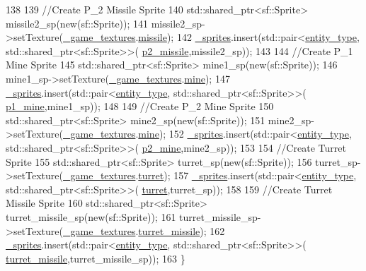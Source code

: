 \begin{DoxyCode}
138 
139     \textcolor{comment}{//Create P\_2 Missile Sprite}
140     std::shared\_ptr<sf::Sprite> missile2\_sp(\textcolor{keyword}{new}(sf::Sprite));
141     missile2\_sp->setTexture(\hyperlink{classDisplay_a64ae525710346f1a982efa05b8c53a88}{\_game\_textures}.\hyperlink{structtextures_a1d12557e92da80a9809f037edfe72f2f}{missile});
142     \hyperlink{classDisplay_a975326ca007706c154317ddef67000f4}{\_sprites}.insert(std::pair<\hyperlink{Structures_8h_a6d8f83e710b27d4f86c45f0bb77066e3}{entity\_type}, std::shared\_ptr<sf::Sprite>>(
      \hyperlink{Structures_8h_a6d8f83e710b27d4f86c45f0bb77066e3a47100170e5852d632dfe65582a18256d}{p2\_missile},missile2\_sp));
143 
144     \textcolor{comment}{//Create P\_1 Mine Sprite}
145     std::shared\_ptr<sf::Sprite> mine1\_sp(\textcolor{keyword}{new}(sf::Sprite));
146     mine1\_sp->setTexture(\hyperlink{classDisplay_a64ae525710346f1a982efa05b8c53a88}{\_game\_textures}.\hyperlink{structtextures_a7f5b6643fd47d1bd8d5758c24c32dc9e}{mine});
147     \hyperlink{classDisplay_a975326ca007706c154317ddef67000f4}{\_sprites}.insert(std::pair<\hyperlink{Structures_8h_a6d8f83e710b27d4f86c45f0bb77066e3}{entity\_type}, std::shared\_ptr<sf::Sprite>>(
      \hyperlink{Structures_8h_a6d8f83e710b27d4f86c45f0bb77066e3afc52e626787e982ae5d0a747bed6666d}{p1\_mine},mine1\_sp));
148 
149     \textcolor{comment}{//Create P\_2 Mine Sprite}
150     std::shared\_ptr<sf::Sprite> mine2\_sp(\textcolor{keyword}{new}(sf::Sprite));
151     mine2\_sp->setTexture(\hyperlink{classDisplay_a64ae525710346f1a982efa05b8c53a88}{\_game\_textures}.\hyperlink{structtextures_a7f5b6643fd47d1bd8d5758c24c32dc9e}{mine});
152     \hyperlink{classDisplay_a975326ca007706c154317ddef67000f4}{\_sprites}.insert(std::pair<\hyperlink{Structures_8h_a6d8f83e710b27d4f86c45f0bb77066e3}{entity\_type}, std::shared\_ptr<sf::Sprite>>(
      \hyperlink{Structures_8h_a6d8f83e710b27d4f86c45f0bb77066e3ada293b37940e64ec2cf6dbd2ae493d2b}{p2\_mine},mine2\_sp));
153 
154     \textcolor{comment}{//Create Turret Sprite}
155     std::shared\_ptr<sf::Sprite> turret\_sp(\textcolor{keyword}{new}(sf::Sprite));
156     turret\_sp->setTexture(\hyperlink{classDisplay_a64ae525710346f1a982efa05b8c53a88}{\_game\_textures}.\hyperlink{structtextures_a8454a0f97657e68ca0076f19c4de6236}{turret});
157     \hyperlink{classDisplay_a975326ca007706c154317ddef67000f4}{\_sprites}.insert(std::pair<\hyperlink{Structures_8h_a6d8f83e710b27d4f86c45f0bb77066e3}{entity\_type}, std::shared\_ptr<sf::Sprite>>(
      \hyperlink{Structures_8h_a6d8f83e710b27d4f86c45f0bb77066e3a85c730ac9ffc13ac94e6e860579928a1}{turret},turret\_sp));
158 
159     \textcolor{comment}{//Create Turret Missile Sprite}
160     std::shared\_ptr<sf::Sprite> turret\_missile\_sp(\textcolor{keyword}{new}(sf::Sprite));
161     turret\_missile\_sp->setTexture(\hyperlink{classDisplay_a64ae525710346f1a982efa05b8c53a88}{\_game\_textures}.\hyperlink{structtextures_aa9ff61d80b32b3520308d8df61a8ea3f}{turret\_missile});
162     \hyperlink{classDisplay_a975326ca007706c154317ddef67000f4}{\_sprites}.insert(std::pair<\hyperlink{Structures_8h_a6d8f83e710b27d4f86c45f0bb77066e3}{entity\_type}, std::shared\_ptr<sf::Sprite>>(
      \hyperlink{Structures_8h_a6d8f83e710b27d4f86c45f0bb77066e3a8f552a1e495ced5aa8775faa1b6a757b}{turret\_missile},turret\_missile\_sp));
163 \}
\end{DoxyCode}
